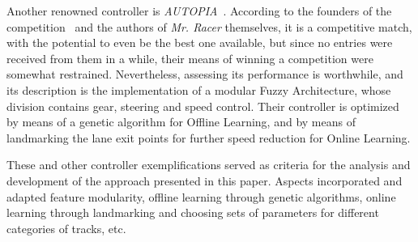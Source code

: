 	Another renowned controller is \emph{AUTOPIA}~\cite{AUTOPIA}. According to the founders of the
	competition~\cite{SCRC} and the authors of \emph{Mr. Racer} themselves, it is a competitive match, with the
	potential to even be the best one available, but since no entries were received from them in a while, their
	means of winning a competition were somewhat restrained. Nevertheless, assessing its performance is
	worthwhile, and its description is the implementation of a modular Fuzzy Architecture, whose division contains
	gear, steering and speed control. Their controller is optimized by means of a genetic algorithm for Offline
	Learning, and by means of landmarking the lane exit points for further speed reduction for Online Learning.
	
	These and other controller exemplifications served as criteria for the analysis and development of the
	approach presented in this paper. Aspects incorporated and adapted feature modularity, offline learning
	through genetic algorithms, online learning through landmarking and choosing sets of parameters for different
	categories of tracks, etc. 